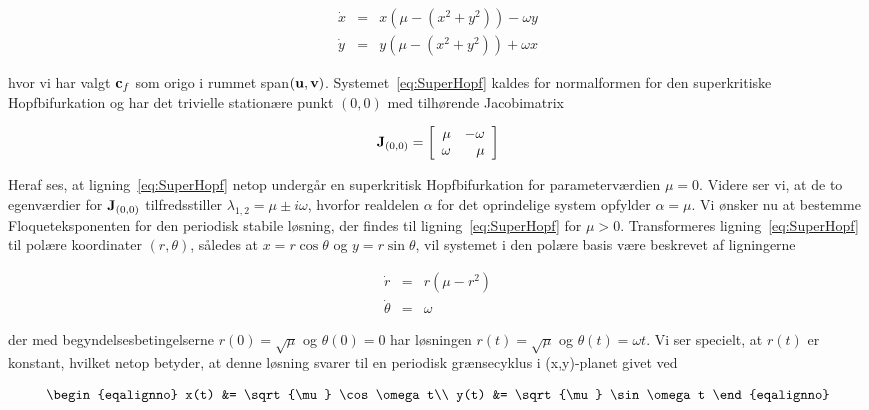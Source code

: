 \begin{equation}
 \begin{array}{lll}
  \dot{x} & = & x(\mu - (x^2 + y^2)) - \omega y\\
  \dot{y} & = & y(\mu - (x^2 + y^2)) + \omega x
 \end{array}
 \label{eq:SuperHopf}
\end{equation}

hvor vi har valgt ${\bf c}_f$ som origo i rummet span$({\bf
u},{\bf v})$. Systemet~\ref{eq:SuperHopf} kaldes for
normalformen for den superkritiske Hopfbifurkation og har
det trivielle station{\ae}re punkt $(0,0)$ med
tilh{\o}rende Jacobimatrix

\begin{equation}
 {\bf J}_{(0,0)} = 
 \left[
 \begin{array}{rr}
  \mu    & -\omega \\
  \omega &  \mu
 \end{array}
 \right]
\end{equation}

Heraf ses, at lig\-ning~\ref{eq:SuperHopf} netop underg{\aa}r
en superkritisk Hopfbifurkation for parameterv{\ae}rdien
$\mu=0$. Videre ser vi, at de to egenv{\ae}rdier for
${\bf J}_{(0,0)}$ tilfredsstiller $\lambda_{1,2} = \mu \pm
i \omega$, hvorfor realdelen $\alpha$ for det oprindelige
sy\-stem opfylder $\alpha = \mu$. Vi {\o}nsker nu at bestemme
Floqueteksponenten for den periodisk stabile l{\o}sning,
der findes til lig\-ning~\ref{eq:SuperHopf} for $\mu > 0$.
Transformeres lig\-ning~\ref{eq:SuperHopf} til pol{\ae}re
koordinater $(r,\theta)$, s{\aa}ledes at $x=r \cos \theta$
og $y=r \sin \theta$, vil sy\-stemet i den pol{\ae}re basis
v{\ae}re beskrevet af lig\-ningerne

\begin{equation}
 \begin{array}{lll}
  \dot{r}      & = & r(\mu - r^2)\\
  \dot{\theta} & = & \omega 
 \end{array}
 \label{eq:SuperHopfPolar}
\end{equation}

der med begyndelsesbetingelserne $r(0)=\sqrt{\mu}$ og
$\theta (0) = 0$ har l{\o}sningen $r(t) = \sqrt{\mu}$ og
$\theta (t) = \omega t$. Vi ser specielt, at $r(t)$ er
konstant, hvilket netop betyder, at denne l{\o}sning svarer
til en periodisk gr{\ae}nsecyklus i (x,y)-planet givet ved

\begin{subequations}
 \begin{eqalignno}
  x(t) &= \sqrt{\mu} \cos \omega t\\
  y(t) &= \sqrt{\mu} \sin \omega t
 \end{eqalignno}
 \label{eq:SuperHopfSol}
\end{subequations}

